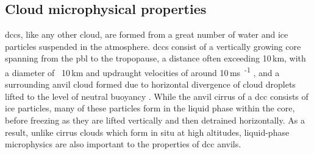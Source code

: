 
\subsection{Cloud microphysical properties}

\acrshort{dcc}s, like any other cloud, are formed from a great number of water and ice particles suspended in the atmosphere.
\acrshort{dcc}s consist of a vertically growing core spanning from the \acrfull{pbl} to the tropopause, a distance often exceeding 10\,\unit{km}, with a diameter of ~10\,\unit{km} and updraught velocities of around 10\,\unit{ms\textsuperscript{-1}} \citep{weisman_mesoscale_2015}, and a surrounding anvil cloud formed due to horizontal divergence of cloud droplets lifted to the level of neutral buoyancy \citep{houze_chapter_2014}.
While the anvil cirrus of a \acrshort{dcc} consists of ice particles, many of these particles form in the liquid phase within the core, before freezing as they are lifted vertically and then detrained horizontally.
As a result, unlike cirrus clouds which form in situ at high altitudes, liquid-phase microphysics are also important to the properties of \acrshort{dcc} anvils.

